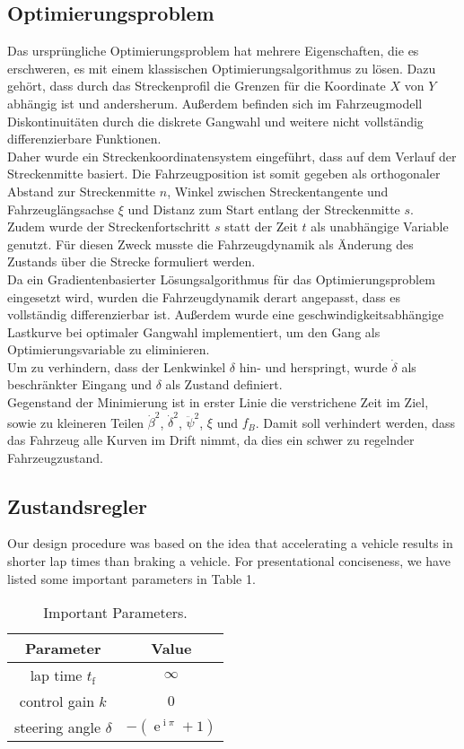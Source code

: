 \documentclass[pdf]{ifacconf}
\begin{document}
\subsection{Optimierungsproblem}
Das ursprüngliche Optimierungsproblem hat mehrere Eigenschaften, die es erschweren, es mit einem klassischen Optimierungsalgorithmus zu lösen. Dazu gehört, dass durch das Streckenprofil die Grenzen für die Koordinate $X$ von $Y$ abhängig ist und andersherum. Außerdem befinden sich im Fahrzeugmodell Diskontinuitäten durch die diskrete Gangwahl  und weitere nicht vollständig differenzierbare Funktionen.\\
Daher wurde ein Streckenkoordinatensystem eingeführt, dass auf dem Verlauf der Streckenmitte basiert. Die Fahrzeugposition ist somit gegeben als orthogonaler Abstand zur Streckenmitte $n$, Winkel zwischen Streckentangente und Fahrzeuglängsachse $\xi$ und Distanz zum Start entlang der Streckenmitte $s$.\\ Zudem wurde der Streckenfortschritt $s$ statt der Zeit $t$ als unabhängige Variable genutzt. Für diesen Zweck musste die Fahrzeugdynamik als Änderung des Zustands über die Strecke formuliert werden.\\
Da ein Gradientenbasierter Lösungsalgorithmus für das Optimierungsproblem eingesetzt wird, wurden die Fahrzeugdynamik derart angepasst, dass es vollständig differenzierbar ist. Außerdem wurde eine geschwindigkeitsabhängige Lastkurve bei optimaler Gangwahl implementiert, um den Gang als Optimierungsvariable zu eliminieren.\\
Um zu verhindern, dass der Lenkwinkel $\delta$ hin- und herspringt, wurde $\dot{\delta}$ als beschränkter Eingang und $\delta$ als Zustand definiert.\\
Gegenstand der Minimierung ist in erster Linie die verstrichene Zeit im Ziel, sowie zu kleineren Teilen $\dot{\beta}^2$, $\dot{\delta}^2$, $\ddot{\psi}^2$, $\xi$ und $f_B$. Damit soll verhindert werden, dass das Fahrzeug alle Kurven im Drift nimmt, da dies ein schwer zu regelnder Fahrzeugzustand.
\subsection{Zustandsregler}
Our design procedure was based on the idea that accelerating a vehicle results in shorter lap times than braking a vehicle. For presentational conciseness, we have listed some important parameters in Table 1.

\begin{table}[h]
\caption{Important Parameters.}
\label{table:working plan}
\centering
\begin{tabular}{|c|c|}
\hline
\bfseries Parameter & \bfseries Value \\ \hline \hline
lap time $t_{\text{f}}$ & $\infty$ \\ \hline
control gain $k$ & $0$ \\ \hline
steering angle $\delta$ & $-\left(\operatorname{e}^{\operatorname{i}\pi}+1\right)$ \\ \hline
 \end{tabular}
\end{table}
\end{document}
